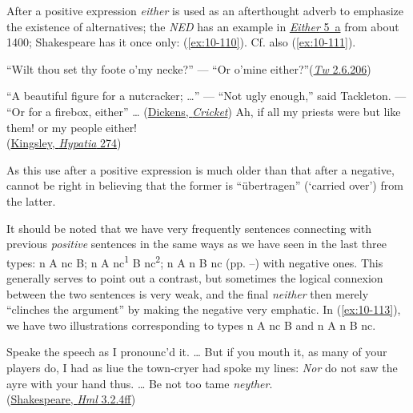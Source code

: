 After a positive expression \textit{either} is used as an afterthought adverb to emphasize the existence of alternatives; the \textit{NED} has an example in \href{https://archive.org/details/oed03arch/page/n819/mode/2up?view=theater}{\textit{Either} 5~a} from about 1400; %
Shakespeare has it once only: (\ref{ex:10-110}). Cf. also (\ref{ex:10-111}).

\ea \label{ex:10-110} ``Wilt thou set thy foote o'my necke?'' --- ``Or o'mine either?''\hfill(\href{https://internetshakespeare.uvic.ca/doc/TN_F1/scene/2.5/index.html#tln-1190}{\textit{Tw} 2.6.206})
\z

\ea \label{ex:10-111}
\ea ``A beautiful figure for a nutcracker; {\dots}'' --- ``Not ugly enough,'' said Tackleton. --- ``Or for a firebox, either'' {\dots} \hfill(\href{https://archive.org/details/cricketonhearthf00dickrich/page/46/mode/2up?q=%22beautiful+figure%22&view=theater}{Dickens, \textit{Cricket}}) %
\ex Ah, if all my priests were but like them! or my people either!\\\hfill(\href{https://archive.org/details/hypatia00kinggoog/page/n342/mode/2up?q=%22if+all+my+priests%22&view=theater}{Kingsley, \textit{Hypatia} 274}) %
\z
\z

As this use after a positive expression is much older than that after a negative, \citet[\href{https://archive.org/details/p2englischephilo01storuoft/page/698/mode/2up?view=theater}{698}]{storm1896englische} cannot be right in believing that the former is ``übertragen'' (`carried over') from the latter.

\bigskip
It should be noted that we have very frequently sentences connecting with previous \textit{positive} sentences in the same ways as we have seen in the last three types: n A nc B; n A nc\textsuperscript{1} B nc\textsuperscript{2}; n A n B nc (pp. \pageref{para:143}--\pageref{para:147})\label{para:147} with negative ones. This generally serves to point out a contrast, but sometimes the logical connexion between the two sentences is very weak, and the final \textit{neither} then merely ``clinches the argument'' by making the negative very emphatic. In (\ref{ex:10-113}), we have two illustrations corresponding to types  n A nc B and n A n B nc.

\ea \label{ex:10-113} Speake the speech as I pronounc'd it. {\dots} But if you mouth it, as many of your players do, I had as liue the town-cryer had spoke my lines: \emph{Nor} do not saw the ayre with your hand thus. {\dots} Be not too tame \emph{neyther}.\\\hfill(\href{https://internetshakespeare.uvic.ca/doc/Ham_F1/scene/3.2/index.html}{Shakespeare, \textit{Hml} 3.2.4ff})
\z


